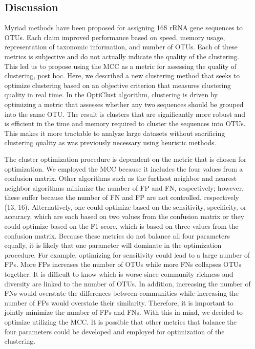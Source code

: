 \documentclass[11pt,]{article}
\begin{document}
\subsection{Discussion}\label{discussion}

Myriad methods have been proposed for assigning 16S rRNA gene sequences
to OTUs. Each claim improved performance based on speed, memory usage,
representation of taxonomic information, and number of OTUs. Each of
these metrics is subjective and do not actually indicate the quality of
the clustering. This led us to propose using the MCC as a metric for
assessing the quality of clustering, post hoc. Here, we described a new
clustering method that seeks to optimize clustering based on an
objective criterion that measures clustering quality in real time. In
the OptiClust algorithm, clustering is driven by optimizing a metric
that assesses whether any two sequences should be grouped into the same
OTU. The result is clusters that are significantly more robust and is
efficient in the time and memory required to cluster the sequences into
OTUs. This makes it more tractable to analyze large datasets without
sacrificing clustering quality as was previously necessary using
heuristic methods.

The cluster optimization procedure is dependent on the metric that is
chosen for optimization. We employed the MCC because it includes the
four values from a confusion matrix. Other algorithms such as the
furthest neighbor and nearest neighbor algorithms minimize the number of
FP and FN, respectively; however, these suffer because the number of FN
and FP are not controlled, respectively (13, 16). Alternatively, one
could optimize based on the sensitivity, specificity, or accuracy, which
are each based on two values from the confusion matrix or they could
optimize based on the F1-score, which is based on three values from the
confusion matrix. Because these metrics do not balance all four
parameters equally, it is likely that one parameter will dominate in the
optimization procedure. For example, optimizing for sensitivity could
lead to a large number of FPs. More FPs increases the number of OTUs
while more FNs collapses OTUs together. It is difficult to know which is
worse since community richness and diversity are linked to the number of
OTUs. In addition, increasing the number of FNs would overstate the
differences between communities while increasing the number of FPs would
overstate their similarity. Therefore, it is important to jointly
minimize the number of FPs and FNs. With this in mind, we decided to
optimize utilizing the MCC. It is possible that other metrics that
balance the four parameters could be developed and employed for
optimization of the clustering.
\end{document}
